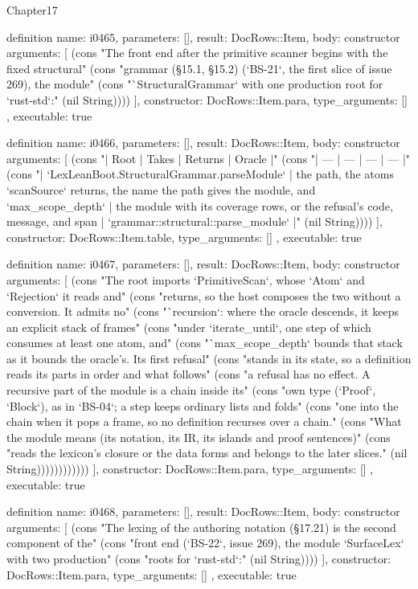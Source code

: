 \begin{lexlean}{Chapter17}
\begin{semanticmodule}
definition{
  name: i0465,
  parameters: [],
  result: DocRows::Item,
  body: constructor{
    arguments: [
      (cons "The front end after the primitive scanner begins with the fixed structural" (cons "grammar (§15.1, §15.2) (`BS-21`, the first slice of issue 269), the module" (cons "`StructuralGrammar` with one production root for `rust-std`:" (nil String))))
    ],
    constructor: DocRows::Item.para,
    type_arguments: []
  },
  executable: true
}

definition{
  name: i0466,
  parameters: [],
  result: DocRows::Item,
  body: constructor{
    arguments: [
      (cons "| Root | Takes | Returns | Oracle |" (cons "| --- | --- | --- | --- |" (cons "| `LexLeanBoot.StructuralGrammar.parseModule` | the path, the atoms `scanSource` returns, the name the path gives the module, and `max_scope_depth` | the module with its coverage rows, or the refusal's code, message, and span | `grammar::structural::parse_module` |" (nil String))))
    ],
    constructor: DocRows::Item.table,
    type_arguments: []
  },
  executable: true
}

definition{
  name: i0467,
  parameters: [],
  result: DocRows::Item,
  body: constructor{
    arguments: [
      (cons "The root imports `PrimitiveScan`, whose `Atom` and `Rejection` it reads and" (cons "returns, so the host composes the two without a conversion. It admits no" (cons "`recursion`: where the oracle descends, it keeps an explicit stack of frames" (cons "under `iterate_until`, one step of which consumes at least one atom, and" (cons "`max_scope_depth` bounds that stack as it bounds the oracle's. Its first refusal" (cons "stands in its state, so a definition reads its parts in order and what follows" (cons "a refusal has no effect. A recursive part of the module is a chain inside its" (cons "own type (`Proof`, `Block`), as in `BS-04`; a step keeps ordinary lists and folds" (cons "one into the chain when it pops a frame, so no definition recurses over a chain." (cons "What the module means (its notation, its IR, its islands and proof sentences)" (cons "reads the lexicon's closure or the data forms and belongs to the later slices." (nil String))))))))))))
    ],
    constructor: DocRows::Item.para,
    type_arguments: []
  },
  executable: true
}

definition{
  name: i0468,
  parameters: [],
  result: DocRows::Item,
  body: constructor{
    arguments: [
      (cons "The lexing of the authoring notation (§17.21) is the second component of the" (cons "front end (`BS-22`, issue 269), the module `SurfaceLex` with two production" (cons "roots for `rust-std`:" (nil String))))
    ],
    constructor: DocRows::Item.para,
    type_arguments: []
  },
  executable: true
}


\end{semanticmodule}
\end{lexlean}
